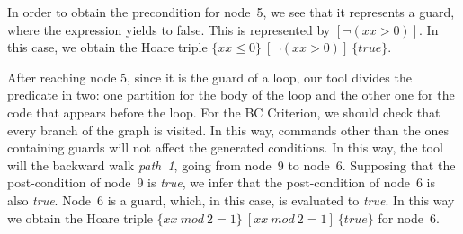 \documentclass[runningheads]{llncs}
\begin{document}
In order to obtain the precondition for node~5, we see that it represents a guard, where the expression yields to false.
This is represented by $[\neg(xx > 0)]$.
In this case, we obtain the Hoare triple $\{xx \leq 0\}\ [\neg(xx > 0)]\ \{true\}$.


After reaching node 5, since it is the guard of a loop, our tool divides the predicate in two: one partition for the body of the loop and the other one for the code that appears before the loop. 
For the BC Criterion, we should check that every branch of the graph is visited.
In this way, commands other than the ones containing guards will not affect the generated conditions.
In this way, the tool will the backward walk \textit{path~1}, going from node~9 to node~6.
Supposing that the post-condition of node~9 is \textit{true}, we infer that the post-condition of node~6 is also \textit{true}.
Node~6 is a guard, which, in this case, is evaluated to \textit{true}.
In this way we obtain the Hoare triple $\{xx\ mod\ 2=1\}\ [xx\ mod\ 2=1]\ \{true\}$ for node~6.




\end{document}
